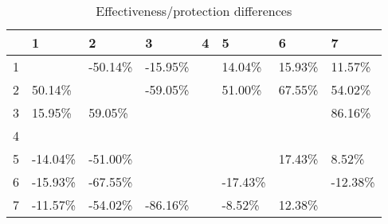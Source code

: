 \begin{table}[ht]
\centering
\begin{tabular}{rlllllll}
  \hline
 & 1 & 2 & 3 & 4 & 5 & 6 & 7 \\ 
  \hline
1 &  & -50.14\% & -15.95\% &  & 14.04\% & 15.93\% & 11.57\% \\ 
  2 & 50.14\% &  & -59.05\% &  & 51.00\% & 67.55\% & 54.02\% \\ 
  3 & 15.95\% & 59.05\% &  &  &  &  & 86.16\% \\ 
  4 &  &  &  &  &  &  &  \\ 
  5 & -14.04\% & -51.00\% &  &  &  & 17.43\% & 8.52\% \\ 
  6 & -15.93\% & -67.55\% &  &  & -17.43\% &  & -12.38\% \\ 
  7 & -11.57\% & -54.02\% & -86.16\% &  & -8.52\% & 12.38\% &  \\ 
   \hline
\end{tabular}
\caption{Effectiveness/protection differences} 
\end{table}
